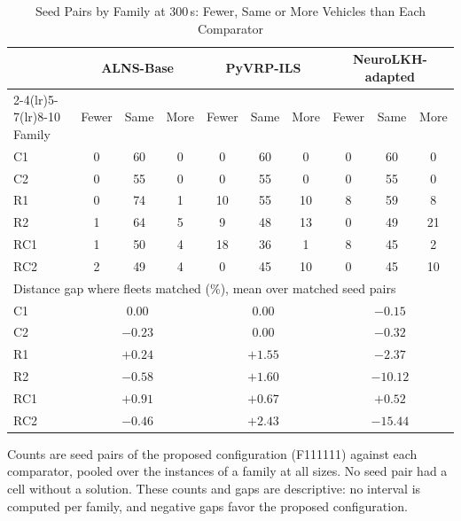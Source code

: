 \documentclass{article}
\begin{document}
\begin{table}[!t]
\centering
\caption{Seed Pairs by Family at 300\,s: Fewer, Same or More Vehicles than Each Comparator}
\label{tab:supp_family}
\footnotesize
\setlength{\tabcolsep}{3pt}
\begin{tabular}{l ccc ccc ccc}
\toprule
 & \multicolumn{3}{c}{ALNS-Base} & \multicolumn{3}{c}{PyVRP-ILS} & \multicolumn{3}{c}{NeuroLKH-adapted} \\
\cmidrule(lr){2-4}\cmidrule(lr){5-7}\cmidrule(lr){8-10}
Family & Fewer & Same & More & Fewer & Same & More & Fewer & Same & More \\
\midrule
C1 & 0 & 60 & 0 & 0 & 60 & 0 & 0 & 60 & 0 \\
C2 & 0 & 55 & 0 & 0 & 55 & 0 & 0 & 55 & 0 \\
R1 & 0 & 74 & 1 & 10 & 55 & 10 & 8 & 59 & 8 \\
R2 & 1 & 64 & 5 & 9 & 48 & 13 & 0 & 49 & 21 \\
RC1 & 1 & 50 & 4 & 18 & 36 & 1 & 8 & 45 & 2 \\
RC2 & 2 & 49 & 4 & 0 & 45 & 10 & 0 & 45 & 10 \\
\midrule
\multicolumn{10}{l}{Distance gap where fleets matched (\%), mean over matched seed pairs} \\
\midrule
C1 & \multicolumn{3}{c}{$0.00$} & \multicolumn{3}{c}{$0.00$} & \multicolumn{3}{c}{$-0.15$} \\
C2 & \multicolumn{3}{c}{$-0.23$} & \multicolumn{3}{c}{$0.00$} & \multicolumn{3}{c}{$-0.32$} \\
R1 & \multicolumn{3}{c}{$+0.24$} & \multicolumn{3}{c}{$+1.55$} & \multicolumn{3}{c}{$-2.37$} \\
R2 & \multicolumn{3}{c}{$-0.58$} & \multicolumn{3}{c}{$+1.60$} & \multicolumn{3}{c}{$-10.12$} \\
RC1 & \multicolumn{3}{c}{$+0.91$} & \multicolumn{3}{c}{$+0.67$} & \multicolumn{3}{c}{$+0.52$} \\
RC2 & \multicolumn{3}{c}{$-0.46$} & \multicolumn{3}{c}{$+2.43$} & \multicolumn{3}{c}{$-15.44$} \\
\bottomrule
\end{tabular}

\vspace{2pt}
{\footnotesize Counts are seed pairs of the proposed configuration (F111111) against each comparator, pooled over the instances of a family at all sizes. No seed pair had a cell without a solution. These counts and gaps are descriptive: no interval is computed per family, and negative gaps favor the proposed configuration.\par}
\end{table}
\end{document}
